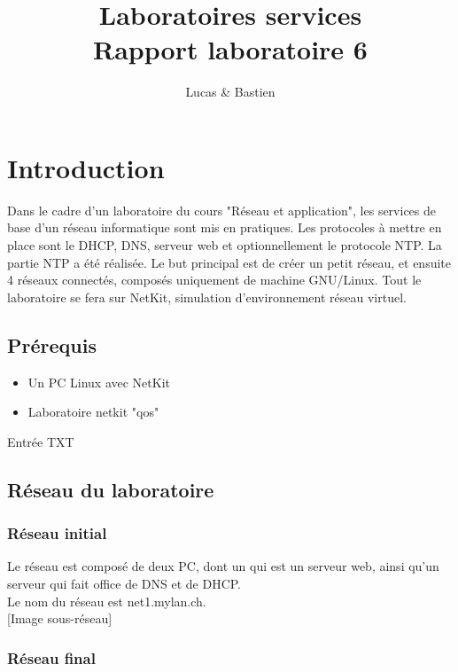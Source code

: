 \documentclass{article}
\title{%
	Laboratoires services \\
	\large Rapport laboratoire 6
}
\author{\bsc{Bulloni} Lucas \& \bsc{Wermeille} Bastien}
\begin{document}
\maketitle

\newpage

\tableofcontents

\newpage

\section{Introduction}
	
Dans le cadre d'un laboratoire du cours "Réseau et application", les services de base d'un réseau informatique sont mis en pratiques. Les protocoles à mettre en place sont le DHCP, DNS, serveur web et optionnellement le protocole NTP. La partie NTP a été réalisée. Le but principal est de créer un petit réseau, et ensuite 4 réseaux connectés, composés uniquement de machine GNU/Linux. Tout le laboratoire se fera sur NetKit, simulation d'environnement réseau virtuel.

\subsection{Prérequis}

\begin{itemize}
	\item Un PC Linux avec NetKit
	\item Laboratoire netkit "qos"
\end{itemize}
Entrée TXT
\subsection{Réseau du laboratoire}

\subsubsection{Réseau initial}

Le réseau est composé de deux PC, dont un qui est un serveur web, ainsi qu'un serveur qui fait office de DNS et de DHCP.\\

Le nom du réseau est net1.mylan.ch.\\

[Image sous-réseau]

\subsubsection{Réseau final}
\end{document}
